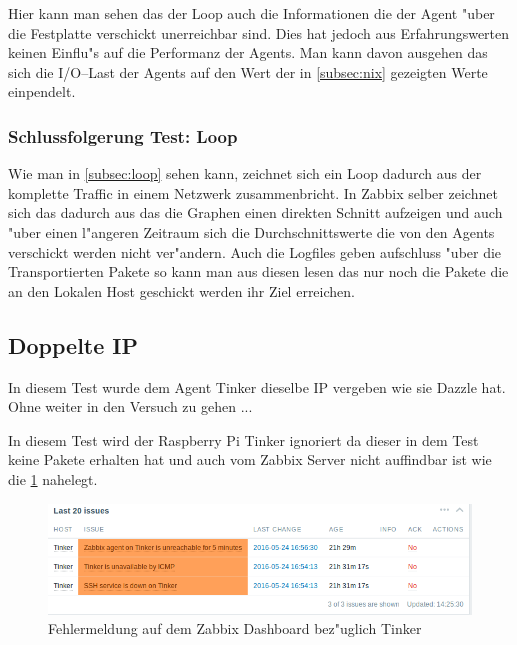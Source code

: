Hier kann man sehen das der Loop auch die Informationen die der Agent "uber die Festplatte verschickt unerreichbar sind. Dies hat jedoch aus Erfahrungswerten keinen Einflu"s auf die %
Performanz der Agents. Man kann davon ausgehen das sich die I/O--Last der Agents auf den Wert der in \cref{subsec:nix} gezeigten Werte einpendelt. %


\subsubsection{Schlussfolgerung Test: Loop}
\label{subsubsec:schlussfolgerung:loop}

Wie man in \cref{subsec:loop} sehen kann, zeichnet sich ein Loop dadurch aus der komplette Traffic in einem Netzwerk zusammenbricht. In Zabbix selber zeichnet sich das %
dadurch aus das die Graphen einen direkten Schnitt aufzeigen und auch "uber einen l"angeren Zeitraum sich die Durchschnittswerte die von den Agents verschickt werden nicht %
ver"andern. Auch die Logfiles geben aufschluss "uber die Transportierten Pakete so kann man aus diesen lesen das nur noch die Pakete die an den Lokalen Host geschickt werden %
ihr Ziel erreichen.  


\subsection{Doppelte IP}

In diesem Test wurde dem Agent Tinker dieselbe IP vergeben wie sie Dazzle hat. Ohne weiter in den Versuch zu gehen ...

In diesem Test wird der Raspberry Pi Tinker ignoriert da dieser in dem Test keine Pakete erhalten hat und auch vom %
Zabbix Server nicht auffindbar ist wie die \cref{fig:fehlermeldungenTinker} nahelegt.

\begin{figure}[htbp]
\centering
\includegraphics*[width=0.9\linewidth]{Abb/ZabbixTinker/DoppelteIP/TinkerFaults}

\caption{Fehlermeldung auf dem Zabbix Dashboard bez"uglich Tinker}
\label{fig:fehlermeldungenTinker}
\end{figure}

